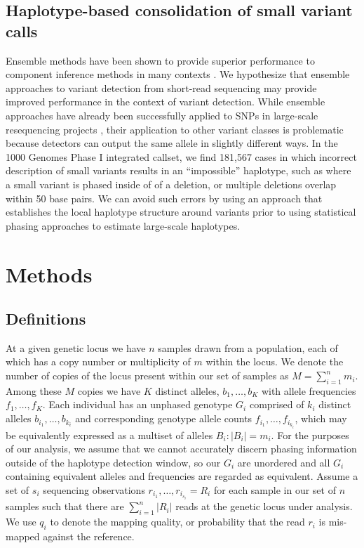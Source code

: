 \documentclass{article}
\begin{document}
\subsection{Haplotype-based consolidation of small variant calls}
\label{sec:ensemble}

Ensemble methods have been shown to provide superior performance to component inference methods in many contexts \citep{opmac99}.  We hypothesize that ensemble approaches to variant detection from short-read sequencing may provide improved performance in the context of variant detection.  While ensemble approaches have already been successfully applied to SNPs in large-scale resequencing projects \citep{1000GPhaseI}, their application to other variant classes is problematic because detectors can output the same allele in slightly different ways.  In the 1000 Genomes Phase I integrated callset, we find 181,567 cases in which incorrect description of small variants results in an ``impossible'' haplotype, such as where a small variant is phased inside of of a deletion, or multiple deletions overlap within 50 base pairs.  We can avoid such errors by using an approach that establishes the local haplotype structure around variants prior to using statistical phasing approaches to estimate large-scale haplotypes.



\section{Methods}
\label{sec:model}

\subsection{Definitions}

At a given genetic locus we have $n$ samples drawn from a population, each of which has a copy number or multiplicity of $m$ within the locus.  We denote the number of copies of the locus present within our set of samples as $M = \sum_{i=1}^n m_i$.  Among these $M$ copies we have $K$ distinct alleles, $b_1,\ldots,b_K$ with allele frequencies $f_1,\ldots,f_K$.  Each individual has an unphased genotype $G_i$ comprised of $k_i$ distinct alleles $b_{i_1},\ldots,b_{k_i}$ and corresponding genotype allele counts $f_{i_1},\ldots,f_{i_{k_i}}$, which may be equivalently expressed as a multiset of alleles $B_i : | B_i | = m_i$.  For the purposes of our analysis, we assume that we cannot accurately discern phasing information outside of the haplotype detection window, so our $G_i$ are unordered and all $G_i$ containing equivalent alleles and frequencies are regarded as equivalent.  Assume a set of $s_i$ sequencing observations $r_{i_1},\ldots,r_{i_{s_i}} = R_i$ for each sample in our set of $n$ samples such that there are $ \sum_{i=1}^n |R_i|$ reads at the genetic locus under analysis.  We use $q_i$ to denote the mapping quality, or probability that the read $r_i$ is mis-mapped against the reference.
\end{document}
